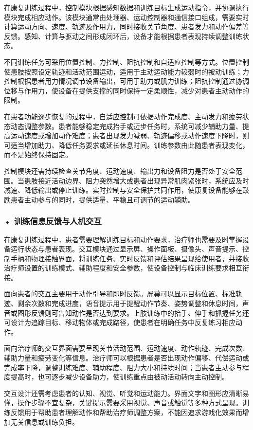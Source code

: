 在康复训练过程中，控制模块根据感知数据和训练目标生成运动指令，并协调执行模块完成相应动作。该模块通常由处理器、运动控制器和通信接口组成，需要实时计算运动方向、速度、轨迹及作用力，同时接收关节角度、患者发力和动作偏差等反馈。感知、计算与驱动之间形成闭环后，设备才能根据患者表现持续调整训练状态。

不同训练任务可采用位置控制、力控制、阻抗控制和自适应控制等方式。位置控制使患肢按照设定轨迹和活动范围运动，适用于主动运动能力较弱时的被动训练；力控制根据患者用力情况调节设备输出，可用于助力或肌力训练；阻抗控制通过协调位移与作用力，使设备在提供支撑的同时保持一定柔顺性，减少对患者主动动作的限制。

在患者功能逐步恢复的过程中，自适应控制可依据动作完成度、主动发力和疲劳状态动态调整参数。患者能够稳定完成抬手或迈步任务时，系统可减少辅助力量、提高运动速度或增加动作难度；患者出现发力减弱、轨迹偏移或动作速度下降时，则可适当增加助力、降低任务要求或延长休息时间。训练参数由此随患者表现变化，而不是始终保持固定。

控制模块还需持续检查关节角度、运动速度、输出力和设备阻力是否处于安全范围。当患肢接近活动边界、阻力突然增大或患者出现异常肌肉紧张时，系统应及时减速、降低输出或停止训练。实时控制与安全保护共同作用，使康复设备能够在鼓励患者主动参与的同时，提供适量、平稳且可调节的运动辅助。

\subsubsection*{\textbf{• 训练信息反馈与人机交互}}

在康复训练过程中，患者需要理解训练目标和动作要求，治疗师也需要及时掌握设备运行状态与患者表现。交互模块通过显示屏、操作面板、摄像头、声音提示、控制手柄和物理接触界面，将训练任务、实时反馈和评估结果呈现给使用者，并接收治疗师设置的训练模式、辅助程度和安全参数，使设备控制与临床训练要求相互衔接。

面向患者的交互主要用于动作引导和即时反馈。屏幕可以显示目标位置、标准轨迹、剩余次数和完成进度，语音提示用于提醒动作节奏、姿势调整和休息时间，声音或图形反馈则可告知动作是否达到要求。上肢训练中的抬手、伸手和抓握任务还可设计为追踪目标、移动物体或完成路径，使患者在明确任务中反复练习相应动作。

面向治疗师的交互界面需要呈现关节活动范围、运动速度、动作轨迹、完成次数、辅助力量和疲劳变化等信息。治疗师可以根据患者是否出现动作偏移、代偿运动或完成率下降，调整训练难度、辅助程度、阻力大小和持续时间；当患者主动参与程度提高时，也可逐步减少设备助力，使训练重点由被动活动转向主动控制。

交互设计还需考虑患者的认知、视觉、听觉和运动能力。界面文字和图形应清晰易懂，操作步骤不宜复杂，关键提示需要采用视觉、声音或触觉等多种方式呈现。训练反馈用于帮助患者理解动作和帮助治疗师调整方案，不能因追求游戏化效果而增加无关信息或训练负担。
